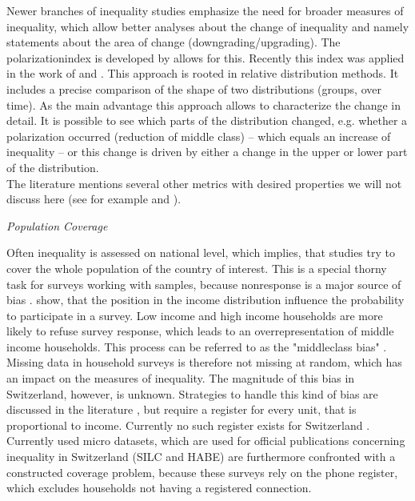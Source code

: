 \documentclass[twoside]{article}\usepackage[]{graphicx}\usepackage[]{color}
\begin{document}
\begin{multicols}{2}

Newer branches of inequality studies emphasize the need for broader measures of inequality, which allow better analyses about the change of inequality and namely statements about the area of change (downgrading/upgrading). The polarizationindex is developed by \citep{Handock and Morris 1999} allows for this. Recently this index was applied in the work of \citep{alderson_exactly_2005} and \citep{gornick_how_2013}. This approach is rooted in relative distribution methods. It includes a precise comparison of the shape of two distributions (groups, over time). As the main advantage this approach allows to characterize the change in detail. It is possible to see which parts of the distribution changed, e.g. whether a polarization occurred (reduction of middle class) -- which equals an increase of inequality -- or this change is driven by either a change in the upper or lower part of the distribution.  \\
 
The literature mentions several other metrics with desired properties we will not discuss here (see for example \citet{cowell_chapter_2000} and \citet{hao_assessing_2010}).



\emph{Population Coverage}
 
Often inequality is assessed on national level, which implies, that studies try to cover the whole population of the country of interest. This is a special thorny task for surveys working with samples, because nonresponse is a major source of bias \citep{bethlehem_handbook_2011}.  \citep{korinek_survey_2006} show, that the position in the income distribution influence the probability to participate in a survey. Low income and high income households are more likely to refuse survey response, which leads to an overrepresentation of middle income households. This process can be referred to as the "middleclass bias" \citep{diekmann_empirische_2009}. Missing data in household surveys is therefore not missing at random, which has an impact on the measures of inequality. The magnitude of this bias in Switzerland, however, is unknown. Strategies to handle this kind of bias are discussed in the literature \citep{sarndal_model_2003}, but require a register for every unit, that is proportional to income. Currently no such register exists for Switzerland \citet[43]{muller_vermogenslage_2014}. Currently used micro datasets, which are used for official publications concerning inequality in Switzerland (SILC and HABE) are furthermore confronted with a constructed coverage problem, because these surveys rely on the phone register, which excludes households not having a registered connection. \\


\end{multicols}
\end{document}
